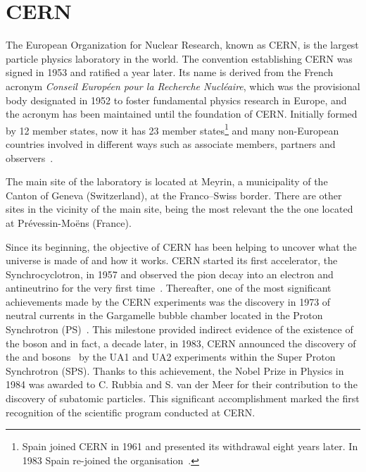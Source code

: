 \section{CERN}
\label{sec:Chap2:CERN}
The European Organization for Nuclear Research, known as CERN, is the largest particle physics laboratory in the
world. The convention establishing CERN was signed in 1953 and ratified a year later.
Its name is derived from the French acronym \textit{Conseil Européen pour la Recherche Nucléaire}, which 
was the provisional body designated in 1952 to foster fundamental physics research in Europe, and the 
acronym has been maintained until the foundation of CERN.
Initially formed by 12 member states, now it has 23 member states\footnote{Spain joined CERN in 
1961 and presented its withdrawal eight years later. In 1983 Spain re-joined the organisation~\cite{SpainWithdrawal, SpainReJoin}.}
 and many non-European countries involved
in different ways such as associate members, partners and observers~\cite{CERN_membersates}.

The main site of the laboratory is located at Meyrin, a municipality of the Canton of Geneva (Switzerland), 
at the Franco--Swiss border. There are other sites in the vicinity of the main site, being the most relevant %
the %
the one located at Prévessin-Moëns (France).

Since its beginning, the objective of CERN has been helping to uncover what the universe is made of and how it works.
CERN started its first accelerator, the Synchrocyclotron, in 1957 and observed 
the pion decay into an electron and antineutrino
for the very first time~\cite{PhysRevLett.1.247}. Thereafter, %
 one of the most significant achievements made by the CERN experiments 
 was the discovery in 1973 of neutral currents in the Gargamelle bubble chamber located 
 in the Proton Synchrotron (PS)~\cite{HASERT1973138}. This milestone provided indirect evidence of the 
 existence of the \PZ boson and in fact, a decade later, in 1983, CERN announced the discovery 
 of the \PZ and \PW bosons~\cite{doi:10.1080/00107518608211015} by the UA1 and UA2 
 experiments within the Super Proton Synchrotron (SPS). 
 Thanks to this achievement, the Nobel Prize in Physics in 1984 was awarded to C. Rubbia and S. van der 
 Meer for their contribution to the discovery of subatomic particles. This significant accomplishment marked the 
 first recognition of the scientific program conducted at CERN.

